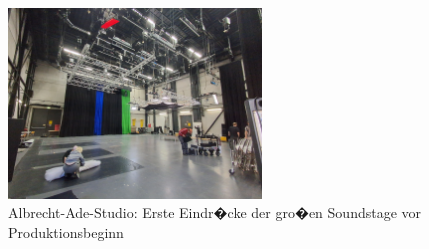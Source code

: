 



\begin{figure}[!htbp]
   \centering
   \includegraphics[width=0.6\textwidth,height=0.25\textheight,keepaspectratio]{images/onSetImages/InsideWideshotAlbrechtAdeStudio.jpg}
   \caption{Albrecht-Ade-Studio: Erste Eindr�cke der gro�en Soundstage vor Produktionsbeginn}
   \label{fig:studio_interior}
\end{figure}

